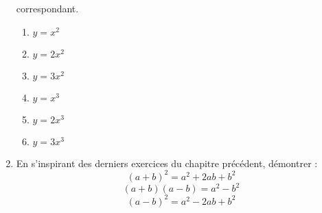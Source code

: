 \begin{enumerate}
 correspondant. \begin{enumerate}
 \item $y = x^2$
 \item $y = 2x^2$ 
 \item $y = 3x^2$ 
 \item $y = x^3$
 \item $y = 2x^3$
 \item $y = 3x^3$
 \end{enumerate}
 \item En s'inspirant des derniers exercices du 
 chapitre précédent, démontrer : 
 \[ (a + b)^2 = a^2 + 2ab + b^2\]
 \[ (a + b)(a - b) = a^2 - b^2\]
 \[ (a - b)^2 = a^2 - 2ab + b^2\]
\end{enumerate} 
 